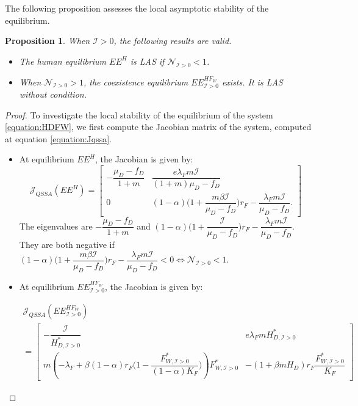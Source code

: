\documentclass{article}
\newcommand{\lfw}{\lambda_{F}}
\newcommand{\lfw}{\lambda_{F}}
\newcommand{\cI}{\mathcal{I}}
\newtheorem{prop}[theorem]{Proposition}
\theoremstyle{definition}
\theoremstyle{remark}
\begin{document}
The following proposition assesses the local asymptotic stability of the equilibrium.

\begin{prop} \label{prop:stab 2D, cI>0}
When $\cI > 0$, the following results are valid.
\begin{itemize}
\item The human equilibrium $EE^{H}$ is LAS if $\mathcal{N}_{\cI > 0} < 1$.
\item When $\mathcal{N}_{\cI > 0} > 1$, the coexistence equilibrium $EE^{HF_W}_{\cI > 0}$ exists. It is LAS without condition.
\end{itemize}
\end{prop}


\begin{proof}
To investigate the local stability of the equilibrium of the system \eqref{equation:HDFW}, we first compute the Jacobian matrix of the system, computed at equation \eqref{equation:Jqssa}.

\begin{itemize}
\item At equilibrium $EE^{H}$, the Jacobian is given by:
\begin{equation*}
\mathcal{J}_{QSSA}(EE^{H}) = \begin{bmatrix}
-\dfrac{\mu_D - f_D}{1 + m} &  \dfrac{e \lfw m \cI}{(1+m)\mu_D - f_D} \\
0 & (1-\alpha)\Big(1+ \dfrac{m \beta \cI}{\mu_D - f_D}\Big)  r_F -  \dfrac{\lfw m  \cI}{\mu_D - f_D}.
\end{bmatrix}
\end{equation*}
The eigenvalues are $-\dfrac{\mu_D - f_D}{1 + m} $ and $(1-\alpha)\Big(1+ \dfrac{\cI}{\mu_D - f_D}\Big)  r_F -  \dfrac{\lfw m  \cI}{\mu_D - f_D}$. They are both negative if $(1-\alpha)\Big(1+ \dfrac{m \beta \cI}{\mu_D - f_D}\Big)  r_F -  \dfrac{\lfw m  \cI}{\mu_D - f_D} <0 \Leftrightarrow \mathcal{N}_{\cI > 0} < 1$.


\item At equilibrium $EE^{HF_W}_{\cI > 0}$, the Jacobian is given by:

\begin{multline*}
\mathcal{J}_{QSSA}(EE^{HF_W}_{\cI > 0}) \\= \begin{bmatrix}
-\dfrac{\cI}{H^*_{D, \cI > 0}} & e \lfw m H^*_{D, \cI > 0} \\
m\left(-\lfw + \beta (1-\alpha) r_F \Big(1- \dfrac{F^*_{W, \cI > 0}}{(1-\alpha)K_F} \Big) \right) F^*_{W, \cI > 0} & -(1+\beta m H_D) r_F \dfrac{F^*_{W, \cI > 0}}{K_F} 
\end{bmatrix}
\end{multline*}


\end{itemize}
\end{proof}
\end{document}

